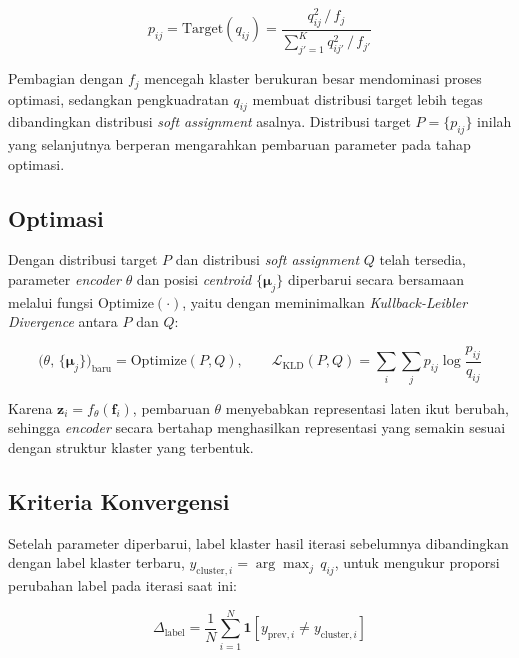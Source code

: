\begin{equation}
    p_{ij} = \text{Target}(q_{ij}) =
    \frac{q_{ij}^2 \,/\, f_j}
    {\displaystyle\sum_{j'=1}^{K} q_{ij'}^2 \,/\, f_{j'}}
    \label{eq:target_dist}
\end{equation}

\noindent Pembagian dengan $f_j$ mencegah klaster berukuran besar
mendominasi proses optimasi, sedangkan pengkuadratan $q_{ij}$ membuat
distribusi target lebih tegas dibandingkan distribusi \textit{soft
assignment} asalnya. Distribusi target $P = \{p_{ij}\}$ inilah yang
selanjutnya berperan mengarahkan pembaruan parameter pada tahap
optimasi.

\subsection{Optimasi}

Dengan distribusi target $P$ dan distribusi \textit{soft assignment}
$Q$ telah tersedia, parameter \textit{encoder} $\theta$ dan posisi
\textit{centroid} $\{\boldsymbol{\mu}_j\}$ diperbarui secara bersamaan
melalui fungsi $\text{Optimize}(\cdot)$, yaitu dengan meminimalkan
\textit{Kullback-Leibler Divergence} antara $P$ dan $Q$:

\begin{equation}
    \big(\theta,\, \{\boldsymbol{\mu}_j\}\big)_{\text{baru}}
    = \text{Optimize}(P, Q), \qquad
    \mathcal{L}_{\text{KLD}}(P, Q) = \sum_{i}\sum_{j}
    p_{ij} \log\frac{p_{ij}}{q_{ij}}
    \label{eq:kld}
\end{equation}

\noindent Karena $\mathbf{z}_i = f_\theta(\mathbf{f}_i)$, pembaruan
$\theta$ menyebabkan representasi laten ikut berubah, sehingga
\textit{encoder} secara bertahap menghasilkan representasi yang
semakin sesuai dengan struktur klaster yang terbentuk.

\subsection{Kriteria Konvergensi}

Setelah parameter diperbarui, label klaster hasil iterasi sebelumnya
dibandingkan dengan label klaster terbaru,
$y_{\text{cluster},i} = \arg\max_j\, q_{ij}$, untuk mengukur proporsi
perubahan label pada iterasi saat ini:

\begin{equation}
    \Delta_{\text{label}} = \frac{1}{N} \sum_{i=1}^{N}
    \mathbf{1}\!\left[y_{\text{prev},i} \neq y_{\text{cluster},i}\right]
    \label{eq:delta_label}
\end{equation}

